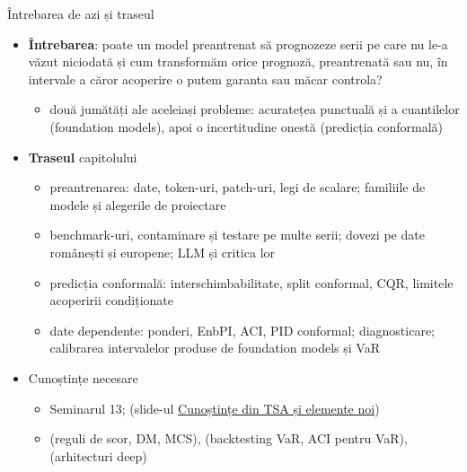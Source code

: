 \begin{frame}{Întrebarea de azi și traseul}
\itemsize{\small}
\begin{itemize}
    \item \textbf{Întrebarea}: poate un model preantrenat să prognozeze serii pe care nu le-a văzut niciodată și cum transformăm orice prognoză, preantrenată sau nu, în intervale a căror acoperire o putem garanta sau măcar controla?
    \begin{itemize}
        \item două jumătăți ale aceleiași probleme: acuratețea punctuală și a cuantilelor (foundation models), apoi o incertitudine onestă (predicția conformală)
    \end{itemize}
    \item \textbf{Traseul} capitolului
    \begin{itemize}
        \item preantrenarea: date, token-uri, patch-uri, legi de scalare; familiile de modele și alegerile de proiectare
        \item benchmark-uri, contaminare și testare pe multe serii; dovezi pe date românești și europene; LLM și critica lor
        \item predicția conformală: interschimbabilitate, split conformal, CQR, limitele acoperirii condiționate
        \item date dependente: ponderi, EnbPI, ACI, PID conformal; diagnosticare; calibrarea intervalelor produse de foundation models și VaR
    \end{itemize}
    \item Cunoștințe necesare
    \begin{itemize}
        \item Seminarul 13;  (slide-ul \hyperlink{c13known}{\textcolor{MainBlue}{Cunoștințe din TSA și elemente noi}})
        \item {} (reguli de scor, DM, MCS),  (backtesting VaR, ACI pentru VaR),  (arhitecturi deep)
    \end{itemize}
\end{itemize}
\end{frame}

